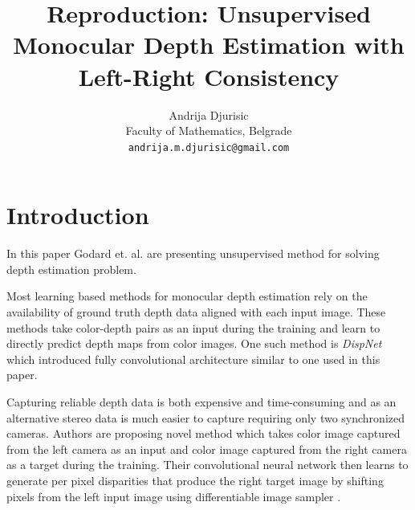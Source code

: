 \documentclass{article}
\title{Reproduction: Unsupervised Monocular Depth Estimation with Left-Right Consistency}
\author{
	Andrija Djurisic\\
	Faculty of Mathematics, Belgrade\\
	\texttt{andrija.m.djurisic@gmail.com} \\
}
\begin{document}
	
	\maketitle
	
	
\section{Introduction}
In this paper Godard et. al. \cite{DBLP:journals/corr/GodardAB16} are presenting unsupervised method for solving depth estimation problem. 

Most learning based methods for monocular depth estimation rely on the availability of ground truth depth data aligned with each input image. These methods take color-depth pairs as an input during the training and learn to directly predict depth maps from color images. One such method is \emph{DispNet} \cite{DBLP:journals/corr/MayerIHFCDB15} which introduced fully convolutional architecture similar to one used in this paper. 

Capturing reliable depth data is both expensive and time-consuming and as an alternative stereo data is much easier to capture requiring only two synchronized cameras. Authors are proposing novel method which takes color image captured from the left camera as an input and color image captured from the right camera as a target during the training. Their convolutional neural network then learns to generate per pixel disparities that produce the right target image by shifting pixels from the left input image using differentiable image sampler \cite{DBLP:journals/corr/GodardAB16}.

\end{document}
